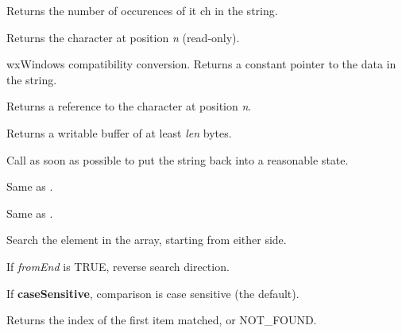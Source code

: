 {

Returns the number of occurences of {it ch} in the string.

\label{wxstringgetchar}


Returns the character at position {\it n} (read-only).

\label{wxstringgetdata}


wxWindows compatibility conversion. Returns a constant pointer to the data in the string.

\label{wxstringgetwritablechar}


Returns a reference to the character at position {\it n}.

\label{wxstringgetwritebuf}


Returns a writable buffer of at least {\it len} bytes.

Call  as soon as possible
to put the string back into a reasonable state.

\label{wxstringindex}


Same as .


Same as .


Search the element in the array, starting from either side.

If {\it fromEnd} is TRUE, reverse search direction.

If {\bf caseSensitive}, comparison is case sensitive (the default).

Returns the index of the first item matched, or NOT\_FOUND.

%
%
\label{wxstringisascii}

}
